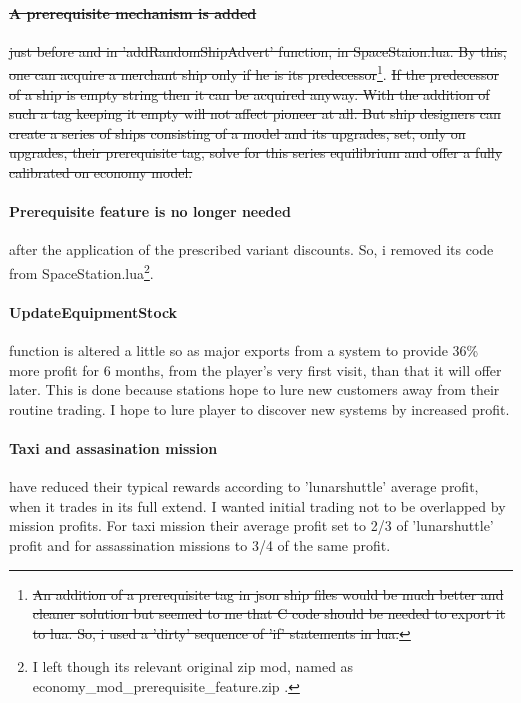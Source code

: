 \documentclass[]{article}
\begin{document}
\paragraph{\sout{A prerequisite mechanism is added}} \sout{ just before and in 'addRandomShipAdvert' function, in SpaceStaion.lua. By this, one can acquire a merchant ship only if he is its predecessor}\footnote{\sout{An addition of a prerequisite tag in json ship files would be much better and cleaner solution but seemed to me that C code should be needed to export it to lua. So, i used a 'dirty' sequence of \textsf{'if'} statements in lua.}}.\sout{ If the predecessor of a ship is empty string then it can be acquired anyway. With the addition of such a tag keeping it empty will not affect pioneer at all. But ship designers can create a series of ships consisting of a model and its upgrades, set, only on upgrades, their prerequisite tag, solve for this series equilibrium and offer a fully calibrated on economy model.}
\paragraph{Prerequisite feature is no longer needed} after the application of the prescribed variant discounts. So, i removed its code from SpaceStation.lua\footnote{I left though its relevant original zip mod, named as economy\_mod\_prerequisite\_feature.zip .}. 
\paragraph{UpdateEquipmentStock} function is altered a little so as major exports from a system to provide 36\% more profit for 6 months, from the player's very first visit, than that it will offer later. This is done because stations hope to lure new customers away from their routine trading. I hope to lure player to discover new systems by increased profit.
\paragraph{Taxi and assasination mission} have reduced their typical rewards according to 'lunarshuttle' average profit, when it trades in its full extend. I wanted initial trading not to be overlapped by mission profits. For taxi mission their average profit set to 2/3 of 'lunarshuttle' profit and for assassination missions to 3/4 of the same profit.
\end{document}
